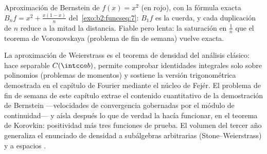 \begin{omfigure}

{\small Aproximación de Bernstein de $f(x) = x^2$ (en rojo), con la
fórmula exacta $B_nf = x^2 + \frac{x(1-x)}{n}$ del~\cref{exo:b2:funcseq:7}: $B_1f$ es la cuerda, y cada duplicación de
$n$ reduce a la mitad la distancia. Fiable pero lenta: la saturación
en $\frac1n$ que el teorema de Voronovskaya (problema de fin de
semana) vuelve exacta.}
\end{omfigure}

\begin{remark}
La aproximación de Weierstrass es el teorema de densidad del
análisis clásico: hace separable $C(\intcc ab)$, permite comprobar
identidades integrales solo sobre polinomios (problemas de momentos)
y sostiene la versión trigonométrica demostrada en el capítulo de
Fourier mediante el núcleo de Fejér. El problema de fin de semana de
este capítulo extrae el contenido cuantitativo de la demostración de
Bernstein ---velocidades de convergencia gobernadas por el módulo de
continuidad--- y aísla después lo que de verdad la hacía funcionar,
en el teorema de Korovkin: positividad más tres funciones de prueba.
El volumen del tercer año generaliza el enunciado de densidad a
subálgebras arbitrarias (Stone--Weierstrass) y a espacios
.
\end{remark}

